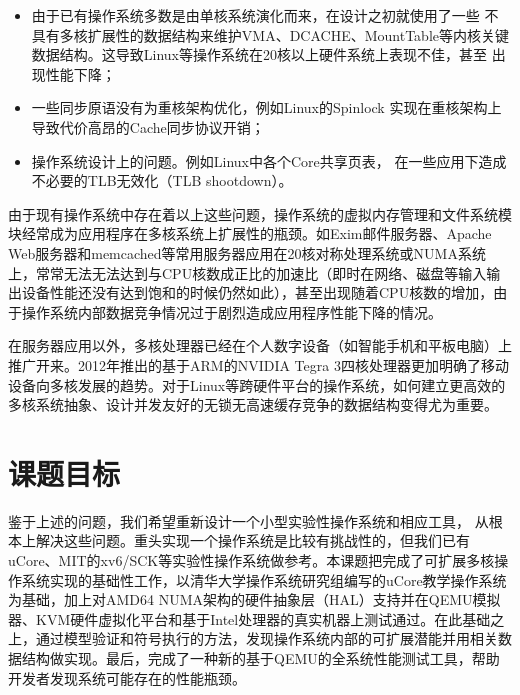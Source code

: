 	\begin{itemize}
		\item
	由于已有操作系统多数是由单核系统演化而来，在设计之初就使用了一些
	不具有多核扩展性的数据结构来维护VMA、DCACHE、MountTable等内核关键
	数据结构。这导致Linux等操作系统在20核以上硬件系统上表现不佳，甚至
	出现性能下降\cite{linux:osdi10}；
		\item 一些同步原语没有为重核架构优化，例如Linux的Spinlock
			实现在重核架构上导致代价高昂的Cache同步协议开销；
		\item
			操作系统设计上的问题。例如Linux中各个Core共享页表，
			在一些应用下造成不必要的TLB无效化（TLB shootdown）。
	\end{itemize}

由于现有操作系统中存在着以上这些问题，操作系统的虚拟内存管理和文件系统模块经常成为应用程序在多核系统上扩展性的瓶颈。如Exim邮件服务器、Apache
Web服务器和memcached等常用服务器应用在20核对称处理系统或NUMA系统上，常常无法无法达到与CPU核数成正比的加速比（即时在网络、磁盘等输入输出设备性能还没有达到饱和的时候仍然如此），甚至出现随着CPU核数的增加，由于操作系统内部数据竞争情况过于剧烈造成应用程序性能下降的情况\cite{linux:osdi10}。

在服务器应用以外，多核处理器已经在个人数字设备（如智能手机和平板电脑）上推广开来。2012年推出的基于ARM的NVIDIA
Tegra
3四核处理器更加明确了移动设备向多核发展的趋势。对于Linux等跨硬件平台的操作系统，如何建立更高效的多核系统抽象、设计并发友好的无锁无高速缓存竞争的数据结构变得尤为重要。

\section{课题目标}

	鉴于上述的问题，我们希望重新设计一个小型实验性操作系统和相应工具，
	从根本上解决这些问题。重头实现一个操作系统是比较有挑战性的，但我们已有uCore、MIT的xv6/SCK等实验性操作系统做参考。本课题把完成了可扩展多核操作系统实现的基础性工作，以清华大学操作系统研究组编写的uCore教学操作系统为基础，加上对AMD64
	NUMA架构的硬件抽象层（HAL）支持并在QEMU模拟器、KVM硬件虚拟化平台和基于Intel处理器的真实机器上测试通过。在此基础之上，通过模型验证和符号执行的方法，发现操作系统内部的可扩展潜能并用相关数据结构做实现。最后，完成了一种新的基于QEMU的全系统性能测试工具，帮助开发者发现系统可能存在的性能瓶颈。


